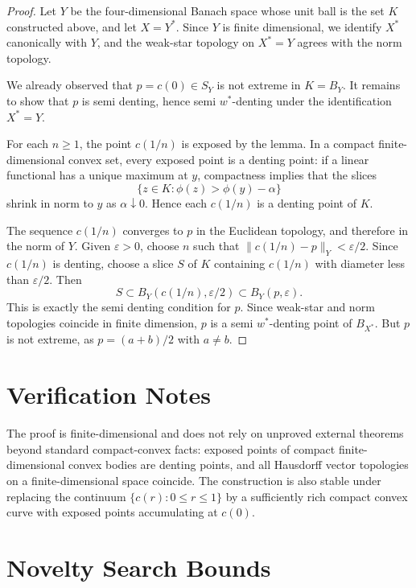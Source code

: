 \documentclass[11pt]{article}
\begin{document}
\begin{proof}
Let \(Y\) be the four-dimensional Banach space whose unit ball is the set
\(K\) constructed above, and let \(X=Y^*\). Since \(Y\) is finite dimensional,
we identify \(X^*\) canonically with \(Y\), and the weak-star topology on
\(X^*=Y\) agrees with the norm topology.

We already observed that \(p=c(0)\in S_Y\) is not extreme in \(K=B_Y\). It
remains to show that \(p\) is semi denting, hence semi \(w^*\)-denting under
the identification \(X^*=Y\).

For each \(n\ge 1\), the point \(c(1/n)\) is exposed by the lemma. In a compact
finite-dimensional convex set, every exposed point is a denting point: if a
linear functional has a unique maximum at \(y\), compactness implies that the
slices
\[
\{z\in K:\phi(z)>\phi(y)-\alpha\}
\]
shrink in norm to \(y\) as \(\alpha\downarrow0\). Hence each \(c(1/n)\) is a
denting point of \(K\).

The sequence \(c(1/n)\) converges to \(p\) in the Euclidean topology, and
therefore in the norm of \(Y\). Given \(\varepsilon>0\), choose \(n\) such that
\(\|c(1/n)-p\|_Y<\varepsilon/2\). Since \(c(1/n)\) is denting, choose a slice
\(S\) of \(K\) containing \(c(1/n)\) with diameter less than
\(\varepsilon/2\). Then
\[
S\subset B_Y(c(1/n),\varepsilon/2)\subset B_Y(p,\varepsilon).
\]
This is exactly the semi denting condition for \(p\). Since weak-star and norm
topologies coincide in finite dimension, \(p\) is a semi \(w^*\)-denting point
of \(B_{X^*}\). But \(p\) is not extreme, as \(p=(a+b)/2\) with \(a\ne b\).
\end{proof}

\section*{Verification Notes}

The proof is finite-dimensional and does not rely on unproved external
theorems beyond standard compact-convex facts: exposed points of compact
finite-dimensional convex bodies are denting points, and all Hausdorff vector
topologies on a finite-dimensional space coincide. The construction is also
stable under replacing the continuum \(\{c(r):0\le r\le1\}\) by a sufficiently
rich compact convex curve with exposed points accumulating at \(c(0)\).

\section*{Novelty Search Bounds}
\end{document}
